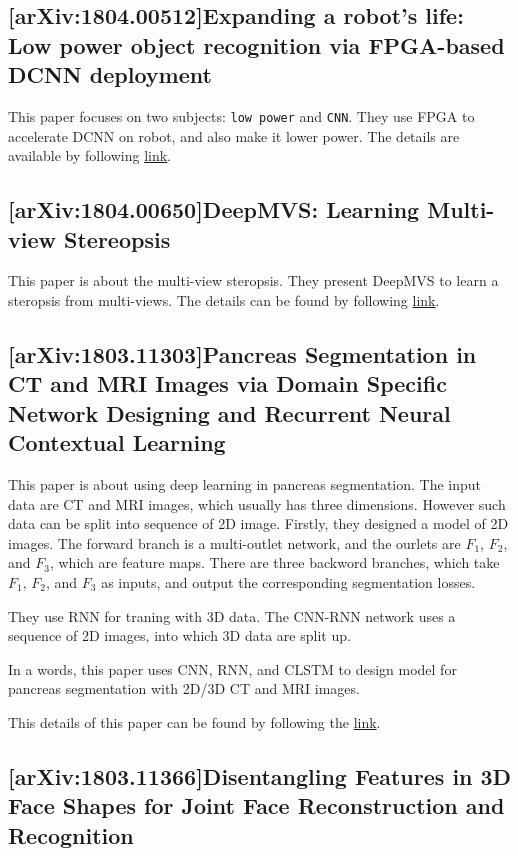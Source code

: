 \subsection{[arXiv:1804.00512]Expanding a robot's life: Low power object
  recognition via FPGA-based DCNN deployment}

This paper focuses on two subjects: \verb|low power| and \verb|CNN|.
They use FPGA to accelerate DCNN on robot, and also make it lower power.
The details are available by following \href{https://arxiv.org/abs/1804.00512}{link}.

\subsection{[arXiv:1804.00650]DeepMVS: Learning Multi-view Stereopsis}

This paper is about the multi-view steropsis. They present DeepMVS to learn a
steropsis from multi-views. The details can be found by following
\href{https://arxiv.org/abs/1804.00650}{link}.

\subsection{[arXiv:1803.11303]Pancreas Segmentation in CT and MRI Images via
  Domain Specific Network Designing and Recurrent Neural Contextual Learning}

This paper is about using deep learning in pancreas segmentation. The input data
are CT and MRI images, which usually has three dimensions. However such data can
be split into sequence of 2D image. Firstly, they designed a model of 2D images.
The forward branch is a multi-outlet network, and the ourlets are $F_1$,
$F_2$, and $F_3$, which are feature maps. There are three backword branches,
which take $F_1$, $F_2$, and $F_3$ as inputs, and output the corresponding
segmentation losses.

They use RNN for traning with 3D data. The CNN-RNN network uses a sequence of 2D
images, into which 3D data are split up.

In a words, this paper uses CNN, RNN, and CLSTM to design model for pancreas
segmentation with 2D/3D CT and MRI images.

This details of this paper can be found by following the
\href{https://arxiv.org/abs/1803.11303}{link}.

\subsection{[arXiv:1803.11366]Disentangling Features in 3D Face Shapes for Joint
  Face Reconstruction and Recognition}

